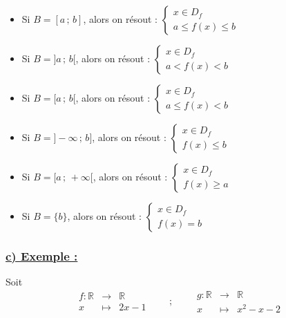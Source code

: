 \documentclass[12pt,a4paper]{article}
\begin{document}
\begin{itemize}

    \item Si $B=[a\,;\,b]$, alors on résout :
    \(
    \begin{cases}
        x\in D_f\\
        a\leq f(x)\leq b
    \end{cases}
    \)

    \item Si $B=]a\,;\,b[$, alors on résout :
    \(
    \begin{cases}
        x\in D_f\\
        a<f(x)<b
    \end{cases}
    \)

    \item Si $B=[a\,;\,b[$, alors on résout :
    \(
    \begin{cases}
        x\in D_f\\
        a\leq f(x)<b
    \end{cases}
    \)

    \item Si $B=]-\infty\,;\,b]$, alors on résout :
    \(
    \begin{cases}
        x\in D_f\\
        f(x)\leq b
    \end{cases}
    \)

    \item Si $B=[a\,;\,+\infty[$, alors on résout :
    \(
    \begin{cases}
        x\in D_f\\
        f(x)\geq a
    \end{cases}
    \)

    \item Si $B=\{b\}$, alors on résout :
    \(
    \begin{cases}
        x\in D_f\\
        f(x)=b
    \end{cases}
    \)

\end{itemize}

\subsubsection*{\underline{\textbf{c) Exemple :}}}

Soit
\[
\begin{array}{rcl}
f:\mathbb{R} & \longrightarrow & \mathbb{R}\\
x & \longmapsto & 2x-1
\end{array}
\qquad;\qquad
\begin{array}{rcl}
g:\mathbb{R} & \longrightarrow & \mathbb{R}\\
x & \longmapsto & x^2-x-2
\end{array}
\]
\end{document}
